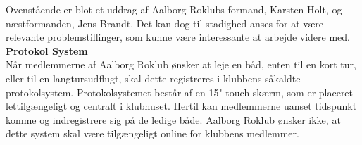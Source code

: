 Ovenstående er blot et uddrag af Aalborg Roklubs formand, Karsten Holt, og næstformanden, Jens Brandt. Det kan dog til stadighed anses for at være relevante problemstillinger, som kunne være interessante at arbejde videre med. \\


{\bf{Protokol System}}\\
Når medlemmerne af Aalborg Roklub ønsker at leje en båd, enten til en kort tur, eller til en langtursudflugt, skal dette registreres i klubbens såkaldte protokolsystem. Protokolsystemet består af en 15" touch-skærm, som er placeret lettilgængeligt og centralt i klubhuset. Hertil kan medlemmerne uanset tidspunkt komme og indregistrere sig på de ledige både. Aalborg Roklub ønsker ikke, at dette system skal være tilgængeligt online for klubbens medlemmer.


